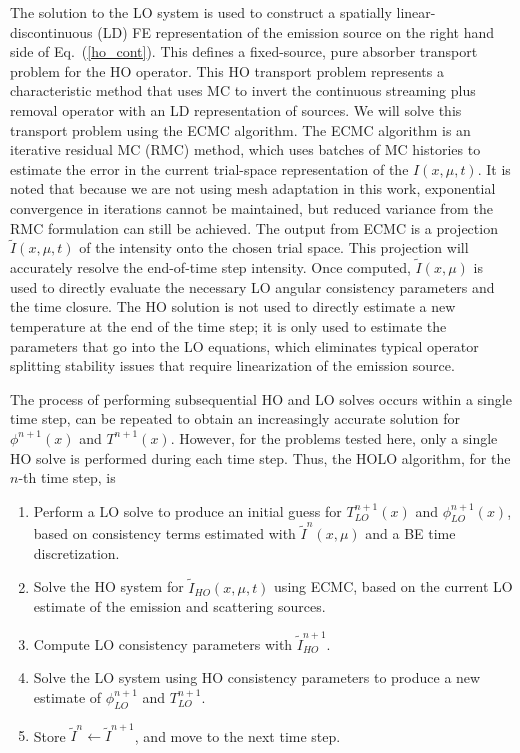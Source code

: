 \documentclass{anstrans}
\renewcommand{\eqref}[1]{(\ref{#1})}
\begin{document}
The solution to the LO system is used to construct a spatially linear-discontinuous (LD) FE representation of
the emission source on the right hand side of Eq.~\eqref{ho_cont}.  This defines a fixed-source, pure absorber
transport problem for the HO operator. This HO transport problem represents a characteristic method that uses MC to
invert the continuous streaming plus removal operator with an LD representation of
sources. We will solve this transport problem using the ECMC algorithm.  The ECMC
algorithm is an iterative residual MC (RMC) method, which uses
batches of MC histories to estimate the error in the current trial-space representation of the
$I(x,\mu,t)$.  It is noted that because we are not using
mesh adaptation in this work, exponential convergence in iterations cannot be maintained,
but reduced variance from the RMC formulation can still be achieved.  The output from ECMC is a projection $\tilde I(x,\mu,t)$ of the intensity onto
the chosen trial space. This projection will accurately resolve the end-of-time step intensity. Once computed, $\tilde{I}(x,\mu)$ is used to directly evaluate the
necessary LO angular consistency parameters and the time closure.   The HO solution is not used to directly estimate a new temperature at
the end of the time step; it is only used to estimate the parameters that go into the LO
equations, which eliminates typical operator splitting stability issues that require linearization of
the emission source.

The process of performing subsequential HO and LO solves occurs within a single time step, can
be repeated to obtain an increasingly accurate solution for $\phi^{n+1}(x)$ and
$T^{n+1}(x)$. However, for the problems tested here, only a single HO solve is performed during each
time step.  Thus, the HOLO algorithm, for the $n$-th time step, is

\begin{enumerate}
    \item Perform a LO solve to produce an initial guess for $T_{LO}^{n+1}(x)$
        and $\phi_{LO}^{n+1}(x)$, based on consistency terms estimated with
        $\tilde{I}^{n}(x,\mu)$ and a BE time
    discretization.
\item Solve the HO system for $\tilde{I}_{HO}(x,\mu,t)$ using ECMC, based on the current
    LO estimate of the emission and scattering sources.%
\item Compute LO consistency parameters with $\tilde{I}_{HO}^{n+1}$.  
\item Solve the LO system using HO consistency parameters to produce a new
    estimate of $\phi^{n+1}_{LO}$ and $T^{n+1}_{LO}$.
\item Store $\tilde{I}^{n}\leftarrow\tilde{I}^{n+1}$, and move to the next time step.
\end{enumerate}
\end{document}
